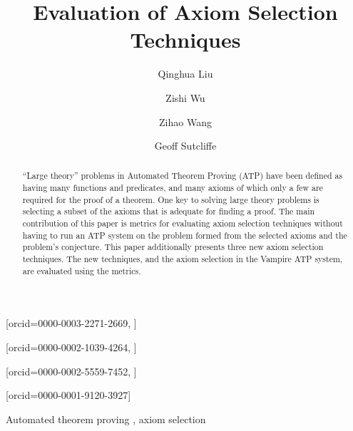 \documentclass[]{ceurart}
\begin{document}


\title{Evaluation of Axiom Selection Techniques}

\author[1]{Qinghua Liu}[orcid=0000-0003-2271-2669, ]
\address[1]{Southwest Jiaotong University, China}

\author[2]{Zishi Wu}[orcid=0000-0002-1039-4264, ]

\author[2]{Zihao Wang}[orcid=0000-0002-5559-7452, ]

\author[2]{Geoff Sutcliffe}[orcid=0000-0001-9120-3927]

\address[2]{University of Miami, USA}

\begin{abstract}
``Large theory'' problems in Automated Theorem Proving (ATP) have been
defined as having many functions and predicates, and many axioms of
which only a few are required for the proof of a theorem.
One key to solving large theory problems is selecting a subset of the axioms
that is adequate for finding a proof.
The main contribution of this paper is metrics for evaluating axiom selection 
techniques without having to run an ATP system on the problem formed from 
the selected axioms and the problem's conjecture.
This paper additionally presents three new axiom selection techniques.
The new techniques, and the axiom selection in the Vampire ATP 
system, are evaluated using the metrics.
\end{abstract}

\begin{keywords}
  Automated theorem proving \sep
  axiom selection
\end{keywords}

\maketitle
\end{document}

